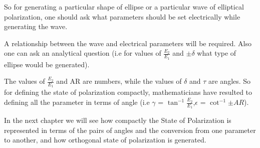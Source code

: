 So for generating a particular shape of ellipse or a particular wave of elliptical polarization, one should ask what parameters should be set electrically while generating the wave.

A relationship between the wave and electrical parameters will be required. Also one can ask an analytical question (i.e for values of $\frac{E_2}{E_1} $ and $ \pm \delta $ what type of ellipse would be generated).

The values of $\frac{E_2}{E_1}$ and AR are numbers, while the values of $\delta$ and $\tau $ are angles. So for defining the state of polarization compactly, mathematicians have resulted to defining all the parameter in terms of angle (i.e $\gamma $ = $\tan^{-1} {\frac{E_2}{E_1}} $,\hspace{0.15cm}$\epsilon $ = $ \cot^{-1} {\pm AR} $). 

In the next chapter we will see how compactly the State of Polarization is represented in terms of the pairs of angles and the conversion from one parameter to another, and how orthogonal state of polarization is generated.